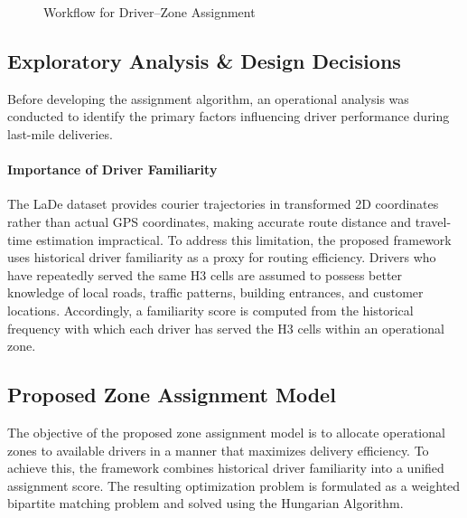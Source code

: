 \documentclass{article}
\begin{document}
\begin{figure}[htbp]
\caption{Workflow for Driver--Zone Assignment}
\label{fig:driver_assignment_workflow}
\end{figure}

\subsection{Exploratory Analysis \& Design Decisions}
Before developing the assignment algorithm, an operational analysis was conducted to identify the primary factors influencing driver performance during last-mile deliveries.

\paragraph{Importance of Driver Familiarity}
The LaDe dataset provides courier trajectories in transformed 2D coordinates rather than actual GPS coordinates, making accurate route distance and travel-time estimation impractical. To address this limitation, the proposed framework uses historical driver familiarity as a proxy for routing efficiency. Drivers who have repeatedly served the same H3 cells are assumed to possess better knowledge of local roads, traffic patterns, building entrances, and customer locations. Accordingly, a familiarity score is computed from the historical frequency with which each driver has served the H3 cells within an operational zone.
\newpage

\subsection{Proposed Zone Assignment Model}
The objective of the proposed zone assignment model is to allocate operational zones to available drivers in a manner that maximizes delivery efficiency. To achieve this, the framework combines historical driver familiarity into a unified assignment score. The resulting optimization problem is formulated as a weighted bipartite matching problem and solved using the Hungarian Algorithm.
\end{document}
